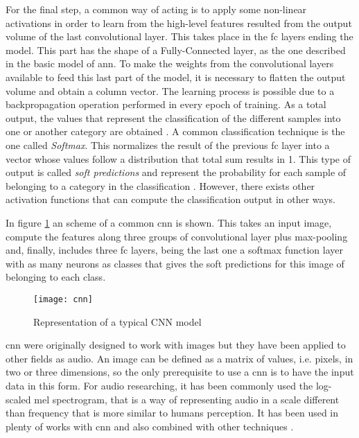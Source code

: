 	For the final step, a common way of acting is to apply some non-linear activations in order to learn from the high-level features resulted from the output volume of the last convolutional layer. This takes place in the \acrlong{fc} layers ending the model. This part has the shape of a Fully-Connected layer, as the one described in the basic model of \acrshort{ann}. To make the weights from the convolutional layers available to feed this last part of the model, it is necessary to flatten the output volume and obtain a column vector. The learning process is possible due to a backpropagation operation performed in every epoch of training. As a total output, the values that represent the classification of the different samples into one or another category are obtained \cite{Saha2018}. A common classification technique is the one called \textit{Softmax}. This normalizes the result of the previous \acrshort{fc} layer into a vector whose values follow a distribution that total sum results in 1. This type of output is called \textit{soft predictions} and represent the probability for each sample of belonging to a category in the classification \cite{Mahmood2018}. However, there exists other activation functions that can compute the classification output in other ways. 
	
	In figure \ref{fig:mesh13} an scheme of a common \acrlong{cnn} is shown. This takes an input image, compute the features along three groups of convolutional layer plus max-pooling and, finally, includes three \acrlong{fc} layers, being the last one a softmax function layer with as many neurons as classes that gives the soft predictions for this image of belonging to each class.
	
	\begin{figure}[ht]
		\centering
		\captionsetup{justification=centering}
		\texttt{[image: cnn]}
		\caption{Representation of a typical CNN model \cite{Hinz2016}}
		\label{fig:mesh13}
	\end{figure}

	\acrfull{cnn} were originally designed to work with images but they have been applied to other fields as audio. An image can be defined as a matrix of values, i.e. pixels, in two or three dimensions, so the only prerequisite to use a \acrshort{cnn} is to have the input data in this form. For audio researching, it has been commonly used the log-scaled mel spectrogram, that is a way of representing audio in a scale different than frequency that is more similar to humans perception. It has been used in plenty of works with \acrshort{cnn} and also combined with other techniques \cite{Salamon2017} \cite{Piczak2015} \cite{Kumar2017}.
	
	
	

	

	
	
	
	
	